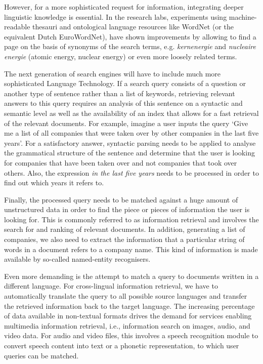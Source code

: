 \documentclass{scrartcl}
\begin{document}
\begin{Parallel}[c]{70mm}{70mm}
{    However, for a more sophisticated request for information, integrating deeper linguistic knowledge is essential. In the research labs, experiments using machine-readable thesauri and ontological language resources like WordNet (or the equivalent Dutch EuroWordNet), have shown improvements by allowing to find a page on the basis of synonyms of the search terms, e.g. \emph{kernenergie}  and \emph{nucleaire energie} (atomic energy, nuclear energy) or even more loosely related terms.

    The next generation of search engines will have to include much more sophisticated Language Technology. If a search query consists of a question or another type of sentence rather than a list of keywords, retrieving relevant answers to this query requires an analysis of this sentence on a syntactic and semantic level as well as the availability of an index that allows for a fast retrieval of the relevant documents. For example, imagine a user inputs the query `Give me a list of all companies that were taken over by other companies in the last five years'. For a satisfactory answer, syntactic parsing needs to be applied to analyse the grammatical structure of the sentence and determine that the user is looking for companies that have been taken over and not companies that took over others. Also, the expression \emph{in the last five years} needs to be processed in order to find out which years it refers to.

    Finally, the processed query needs to be matched against a huge amount of unstructured data in order to find the piece or pieces of information the user is looking for. This is commonly referred to as information retrieval and involves the search for and ranking of relevant documents. In addition, generating a list of companies, we also need to extract the information that a particular string of words in a document refers to a company name. This kind of information is made available by so-called named-entity recognisers.

    Even more demanding is the attempt to match a query to documents written in a different language. For cross-lingual information retrieval, we have to automatically translate the query to all possible source languages and transfer the retrieved information back to the target language. The increasing percentage of data available in non-textual formats drives the demand for services enabling multimedia information retrieval, i.e., information search on images, audio, and video data. For audio and video files, this involves a speech recognition module to convert speech content into text or a phonetic representation, to which user queries can be matched.

}
\end{Parallel}
\end{document}
